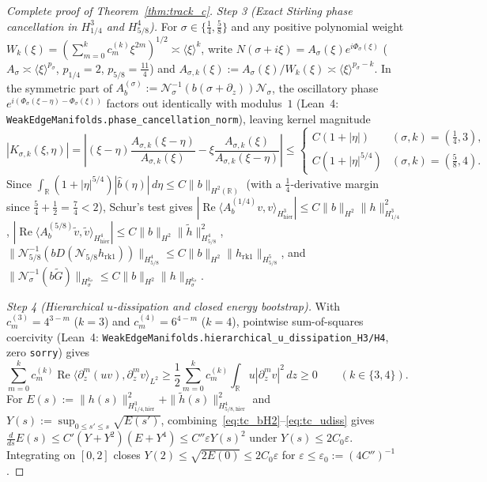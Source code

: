 \documentclass[11pt,a4paper]{article}
\begin{document}
\begin{proof}[Complete proof of Theorem~\ref{thm:track_c}]
\emph{Step 3 (Exact Stirling phase cancellation in $H^3_{1/4}$ and $H^4_{5/8}$).}
For $\sigma\in\{\tfrac14,\tfrac58\}$ and any positive polynomial weight $W_k(\xi)=(\sum_{m=0}^k c_m^{(k)}\xi^{2m})^{1/2}\asymp\langle\xi\rangle^k$, write $N(\sigma+i\xi)=A_\sigma(\xi)e^{i\Phi_\sigma(\xi)}$ ($A_\sigma\asymp\langle\xi\rangle^{p_\sigma}$, $p_{1/4}=2$, $p_{5/8}=\tfrac{11}{4}$) and $A_{\sigma,k}(\xi):=A_\sigma(\xi)/W_k(\xi)\asymp\langle\xi\rangle^{p_\sigma-k}$.  In the symmetric part of $A_b^{(\sigma)}:=\mathcal{N}_\sigma^{-1}(b(\sigma+\partial_z))\mathcal{N}_\sigma$, the oscillatory phase $e^{i(\Phi_\sigma(\xi-\eta)-\Phi_\sigma(\xi))}$ factors out identically with modulus~$1$ (Lean~4: \texttt{WeakEdgeManifolds.phase\_cancellation\_norm}), leaving kernel magnitude
\[
|K_{\sigma,k}(\xi,\eta)|=\left|(\xi-\eta)\frac{A_{\sigma,k}(\xi-\eta)}{A_{\sigma,k}(\xi)}-\xi\frac{A_{\sigma,k}(\xi)}{A_{\sigma,k}(\xi-\eta)}\right|
\le\begin{cases} C(1+|\eta|) & (\sigma,k)=(\tfrac14,3),\\ C(1+|\eta|^{5/4}) & (\sigma,k)=(\tfrac58,4). \end{cases}
\]
Since $\int_{\mathbb{R}}(1+|\eta|^{5/4})|\widehat b(\eta)|\,d\eta\le C\|b\|_{H^2(\mathbb{R})}$ (with a $\tfrac14$-derivative margin since $\tfrac54+\tfrac12=\tfrac74<2$), Schur's test gives $|\operatorname{Re}\langle A_b^{(1/4)}v,v\rangle_{H^3_{\mathrm{hier}}}|\le C\|b\|_{H^2}\|h\|_{H^3_{1/4}}^2$, $|\operatorname{Re}\langle A_b^{(5/8)}\tilde v,\tilde v\rangle_{H^4_{\mathrm{hier}}}|\le C\|b\|_{H^2}\|\tilde h\|_{H^4_{5/8}}^2$, $\|\mathcal{N}_{5/8}^{-1}(b D(\mathcal{N}_{5/8}h_{\mathrm{rk1}}))\|_{H^4_{5/8}}\le C\|b\|_{H^2}\|h_{\mathrm{rk1}}\|_{H^5_{5/8}}$, and $\|\mathcal{N}_\sigma^{-1}(b\widetilde G)\|_{H^{k_\sigma}_\sigma}\le C\|b\|_{H^2}\|h\|_{H^{k_\sigma}_\sigma}$.

\emph{Step 4 (Hierarchical $u$-dissipation and closed energy bootstrap).}
With $c_m^{(3)}=4^{3-m}$ ($k=3$) and $c_m^{(4)}=6^{4-m}$ ($k=4$), pointwise sum-of-squares coercivity (Lean~4: \texttt{WeakEdgeManifolds.hierarchical\_u\_dissipation\_H3/H4}, zero \texttt{sorry}) gives
\begin{equation}\label{eq:tc_udiss}
\sum_{m=0}^k c_m^{(k)}\operatorname{Re}\langle\partial_z^m(u v),\partial_z^m v\rangle_{L^2}
\ge \frac12\sum_{m=0}^k c_m^{(k)}\int_{\mathbb{R}} u|\partial_z^m v|^2\,dz\ge 0 \qquad(k\in\{3,4\}).
\end{equation}
For $E(s):=\|h(s)\|_{H^3_{1/4,\mathrm{hier}}}^2+\|\tilde h(s)\|_{H^4_{5/8,\mathrm{hier}}}^2$ and $Y(s):=\sup_{0\le s'\le s}\sqrt{E(s')}$, combining~\eqref{eq:tc_bH2}--\eqref{eq:tc_udiss} gives $\frac{d}{ds}E(s)\le C'(Y+Y^2)(E+Y^4)\le C''\varepsilon Y(s)^2$ under $Y(s)\le 2C_0\varepsilon$.  Integrating on $[0,2]$ closes $Y(2)\le\sqrt{2E(0)}\le 2C_0\varepsilon$ for $\varepsilon\le\varepsilon_0:=(4C'')^{-1}$.


\end{proof}
\end{document}
